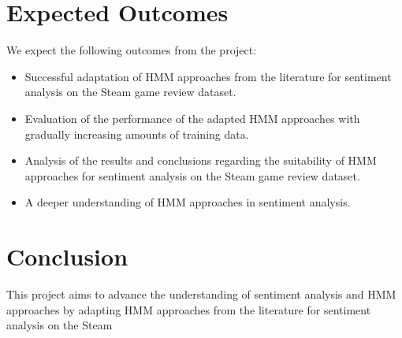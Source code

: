 \documentclass{article}
\begin{document}
\section{Expected Outcomes}
We expect the following outcomes from the project:
\begin{itemize}
\item Successful adaptation of HMM approaches from the literature for sentiment analysis on the Steam game review dataset.
\item Evaluation of the performance of the adapted HMM approaches with gradually increasing amounts of training data.
\item Analysis of the results and conclusions regarding the suitability of HMM approaches for sentiment analysis on the Steam game review dataset.
\item A deeper understanding of HMM approaches in sentiment analysis.
\end{itemize}

\section{Conclusion}
This project aims to advance the understanding of sentiment analysis and HMM approaches by adapting HMM approaches from the literature for sentiment analysis on the Steam
\end{document}
